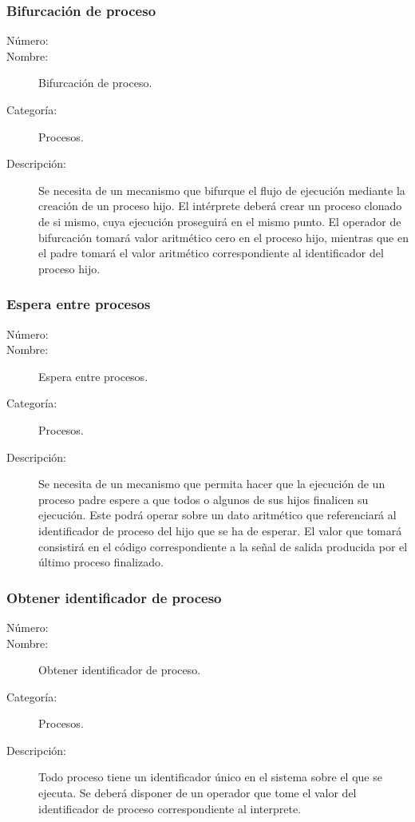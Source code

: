 \subsubsection{Bifurcación de proceso}
\begin{framed}
	\begin{description}
		\item [Número:] \cn
		\item [Nombre:] Bifurcación de proceso.
		\item [Categoría:] Procesos.
		\item [Descripción:] Se necesita de un mecanismo que bifurque el flujo de ejecución mediante la creación de un proceso hijo.
		El intérprete deberá crear un proceso clonado de si mismo, cuya ejecución proseguirá en el mismo punto. El operador 
		de bifurcación tomará valor aritmético cero en el proceso hijo, mientras que en el padre tomará el valor aritmético
		correspondiente al identificador del proceso hijo.    
	\end{description}
\end{framed}

\subsubsection{Espera entre procesos}
\begin{framed}
	\begin{description}
		\item [Número:] \cn
		\item [Nombre:] Espera entre procesos.
		\item [Categoría:] Procesos.
		\item [Descripción:] Se necesita de un mecanismo que permita hacer que la ejecución de un proceso padre espere 
		a que todos o algunos de sus hijos finalicen su ejecución. Este podrá operar sobre un dato aritmético 
		que referenciará al identificador de proceso del hijo que se ha de esperar. El valor que tomará consistirá en
		el código correspondiente a la señal de salida producida por el último proceso finalizado.     
	\end{description}
\end{framed}

\subsubsection{Obtener identificador de proceso}
\begin{framed}
	\begin{description}
		\item [Número:] \cn
		\item [Nombre:] Obtener identificador de proceso.
		\item [Categoría:] Procesos.
		\item [Descripción:] Todo proceso tiene un identificador único en el sistema sobre el que se ejecuta. Se deberá
		disponer de un operador que tome el valor del identificador de proceso correspondiente al interprete.     
	\end{description}
\end{framed}

